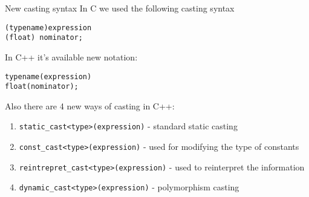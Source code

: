 \begin{frame}[fragile]{New casting syntax}
In C we used the following casting syntax
\begin{lstlisting}
(typename)expression
(float) nominator;
\end{lstlisting}
In C++ it's available new notation:
\begin{lstlisting}
typename(expression)
float(nominator);
\end{lstlisting}
Also there are 4 new ways of casting in C++:
\begin{enumerate}
  \item \texttt{static\_cast<type>(expression)} - standard static casting
  \item \texttt{const\_cast<type>(expression)} - used for modifying the type
  of constants
  \item \texttt{reintrepret\_cast<type>(expression)} - used to reinterpret the
  information
  \item \texttt{dynamic\_cast<type>(expression)} - polymorphism casting
 
\end{enumerate}
\end{frame}
